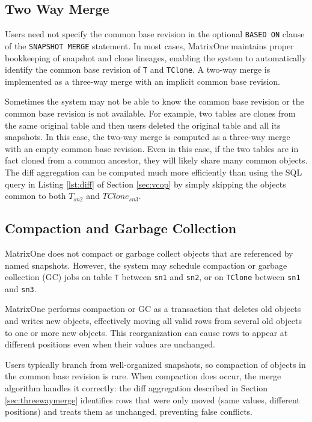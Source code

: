 \documentclass[sigconf,nonacm]{acmart} %
\begin{document}
\subsection{Two Way Merge}
Users need not specify the common base revision in the optional 
\texttt{BASED ON} clause of the \texttt{SNAPSHOT MERGE} statement.  
In most cases, MatrixOne maintains proper bookkeeping of snapshot and clone 
lineages, enabling the system to automatically identify the common base revision 
of \texttt{T} and \texttt{TClone}. A two-way merge is implemented as a three-way 
merge with an implicit common base revision.

Sometimes the system may not be able to know the common base revision or 
the common base revision is not available.  For example, two tables are clones 
from the same original table and then users deleted the original table and 
all its snapshots.  In this case, the two-way merge is computed as a three-way
merge with an empty common base revision.  Even in this case, if the two tables
are in fact cloned from a common ancestor, they will likely share many common 
objects.  The diff aggregation can be computed much more efficiently than using 
the SQL query in Listing \ref{lst:diff} of Section \ref{sec:vcop} by simply 
skipping the objects common to both $T_{sn2}$ and $TClone_{sn3}$.

\subsection{Compaction and Garbage Collection}
MatrixOne does not compact or garbage collect objects that 
are referenced by named snapshots. However, the system may
schedule compaction or garbage collection (GC) jobs on table \texttt{T} between 
\texttt{sn1} and \texttt{sn2}, or on \texttt{TClone} between \texttt{sn1} and \texttt{sn3}.  

MatrixOne performs compaction or GC as a transaction that deletes old objects and 
writes new objects, effectively moving all valid rows from several old objects to 
one or more new objects. This reorganization can cause rows to appear at different 
positions even when their values are unchanged.

Users typically branch from well-organized snapshots, so compaction of objects
in the common base revision is rare. When compaction does occur, the merge algorithm 
handles it correctly: the diff aggregation described in Section \ref{sec:threewaymerge} 
identifies rows that were only moved (same values, different positions) and treats 
them as unchanged, preventing false conflicts.
\end{document}
